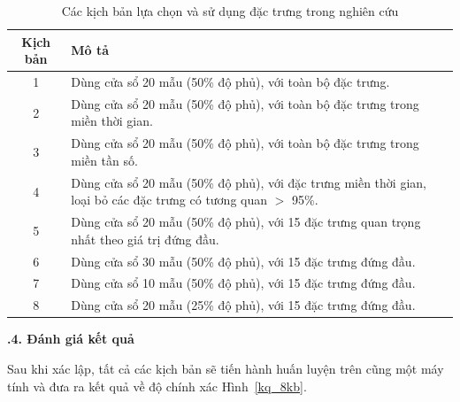 \begin{table}[H]
    \caption{Các kịch bản lựa chọn và sử dụng đặc trưng trong nghiên cứu}
    \label{tab:scenarios}
    \begin{center}
        \renewcommand{\arraystretch}{1.2}
        \begin{tabular}{|c|p{10cm}|}
            \hline
            \textbf{Kịch bản} & \textbf{Mô tả}                                                                                                \\
            \hline
            1                 & Dùng cửa sổ 20 mẫu (50\% độ phủ), với toàn bộ đặc trưng.                                                      \\
            \hline
            2                 & Dùng cửa sổ 20 mẫu (50\% độ phủ), với toàn bộ đặc trưng trong miền thời gian.                                 \\
            \hline
            3                 & Dùng cửa sổ 20 mẫu (50\% độ phủ), với toàn bộ đặc trưng trong miền tần số.                                    \\
            \hline
            4                 & Dùng cửa sổ 20 mẫu (50\% độ phủ), với đặc trưng miền thời gian, loại bỏ các đặc trưng có tương quan $>$ 95\%. \\
            \hline
            5                 & Dùng cửa sổ 20 mẫu (50\% độ phủ), với 15 đặc trưng quan trọng nhất theo giá trị đứng đầu.                     \\
            \hline
            6                 & Dùng cửa sổ 30 mẫu (50\% độ phủ), với 15 đặc trưng đứng đầu.                                                  \\
            \hline
            7                 & Dùng cửa sổ 10 mẫu (50\% độ phủ), với 15 đặc trưng đứng đầu.                                                  \\
            \hline
            8                 & Dùng cửa sổ 20 mẫu (25\% độ phủ), với 15 đặc trưng đứng đầu.                                                  \\
            \hline
        \end{tabular}
    \end{center}
\end{table}

\noindent\textbf{\fontsize{14}{5}.4. Đánh giá kết quả}

Sau khi xác lập, tất cả các kịch bản sẽ tiến hành huấn luyện trên cũng một máy
tính và đưa ra kết quả về độ chính xác Hình~\ref{kq_8kb}.

